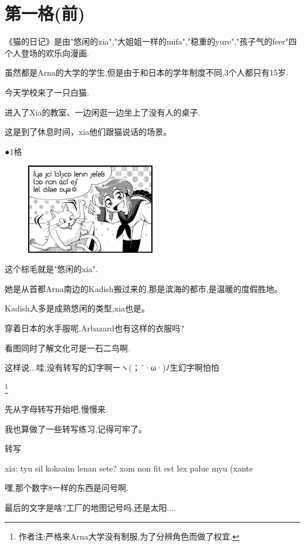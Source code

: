 \chapter{第一格(前)}

《猫的日记》是由"悠闲的xia","大姐姐一样的mifa","稳重的yure","孩子气的feer"四个人登场的欢乐向漫画.

虽然都是Arna的大学的学生,但是由于和日本的学年制度不同,3个人都只有15岁.

今天学校来了一只白猫.

进入了Xia的教室、一边闲逛一边坐上了没有人的桌子.

这是到了休息时间，xia他们跟猫说话的场景。


●1格
\begin{figure}[H]
\includegraphics[width=0.5\textwidth]{ARKA/uni1.png}%
\end{figure}



这个棕毛就是"悠闲的xia".

她是从首都Arna南边的Kadish搬过来的,那是滨海的都市,是温暖的度假胜地。

Kadish人多是成熟悠闲的类型,xia也是。


穿着日本的水手服呢.Arbazard也有这样的衣服吗?

看图同时了解文化可是一石二鸟啊.

这样说...哇,没有转写的幻字啊ーヽ(；´·ω·)ﾉ生幻字啊{\tiny 怕怕}

\footnote{作者注:严格来Arna大学没有制服,为了分辨角色而做了权宜.}

先从字母转写开始吧.慢慢来.

我也算做了一些转写练习,记得可牢了。

\FiveStar 转写

xia: tyu sil koksaim lenan sete? xom non fit est lex palue myu (xante


嘿,那个数字8一样的东西是问号啊.

最后的文字是啥?工厂的地图记号吗,还是太阳....



